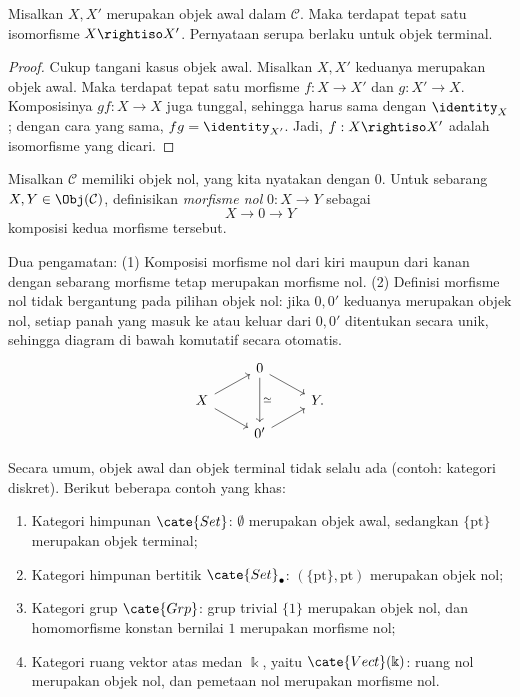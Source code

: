 \begin{proposition}\label{prop:initial-obj-uniqueness}
	Misalkan $X, X'$ merupakan objek awal dalam $\mathcal{C}$. Maka terdapat tepat satu isomorfisme $X \rightiso X'$. Pernyataan serupa berlaku untuk objek terminal.
\end{proposition}
\begin{proof}
	Cukup tangani kasus objek awal. Misalkan $X, X'$ keduanya merupakan objek awal. Maka terdapat tepat satu morfisme $f: X \to X'$ dan $g: X' \to X$. Komposisinya $gf: X \to X$ juga tunggal, sehingga harus sama dengan $\identity_X$; dengan cara yang sama, $fg = \identity_{X'}$. Jadi, $f: X \rightiso X'$ adalah isomorfisme yang dicari.
\end{proof}

\begin{definition}\label{def:zero-morphism}
	Misalkan $\mathcal{C}$ memiliki objek nol, yang kita nyatakan dengan $0$. Untuk sebarang $X, Y \in \Obj(\mathcal{C})$, definisikan \emph{morfisme nol} $0: X \to Y$ sebagai
	\[ X \to 0 \to Y \]
	komposisi kedua morfisme tersebut.
\end{definition}

Dua pengamatan: (1) Komposisi morfisme nol dari kiri maupun dari kanan dengan sebarang morfisme tetap merupakan morfisme nol. (2) Definisi morfisme nol tidak bergantung pada pilihan objek nol: jika $0, 0'$ keduanya merupakan objek nol, setiap panah yang masuk ke atau keluar dari $0, 0'$ ditentukan secara unik, sehingga diagram di bawah komutatif secara otomatis.
\[ \begin{tikzcd}[row sep=small]
	{} & 0 \arrow[rd] \arrow[dd, "\simeq"] & {} \\
	X \arrow[ru] \arrow[rd] & & Y . \\
	& 0' \arrow[ru] &
\end{tikzcd} \]

\begin{example}
	Secara umum, objek awal dan objek terminal tidak selalu ada (contoh: kategori diskret). Berikut beberapa contoh yang khas:
	\begin{enumerate}
		\item Kategori himpunan $\cate{Set}$: $\emptyset$ merupakan objek awal, sedangkan $\{\text{pt}\}$ merupakan objek terminal;
		\item Kategori himpunan bertitik $\cate{Set}_\bullet$: $(\{\text{pt}\}, \text{pt})$ merupakan objek nol;
		\item Kategori grup $\cate{Grp}$: grup trivial $\{1\}$ merupakan objek nol, dan homomorfisme konstan bernilai $1$ merupakan morfisme nol;
		\item Kategori ruang vektor atas medan $\Bbbk$, yaitu $\cate{Vect}(\Bbbk)$: ruang nol merupakan objek nol, dan pemetaan nol merupakan morfisme nol.
	\end{enumerate}
\end{example}

